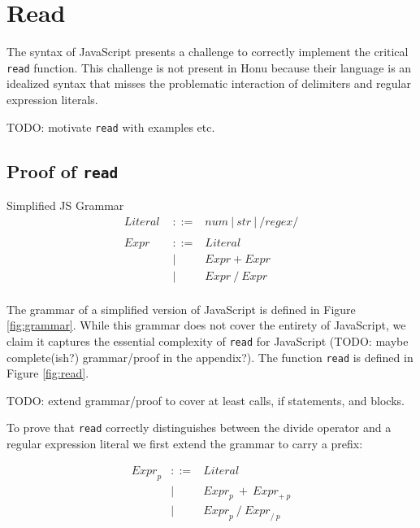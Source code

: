 \documentclass[preprint,10pt]{sigplanconf}
\begin{document}
\section{Read}
\label{sec-3}

The syntax of JavaScript presents a challenge to correctly implement
the critical \texttt{read} function. This challenge is not present in Honu
because their language is an idealized syntax that misses the
problematic interaction of delimiters and regular expression literals.

TODO: motivate \texttt{read} with examples etc.

\subsection{Proof of \texttt{read}}
\label{sec-3-1}

\begin{displayfigure}{\label{fig:grammar}Simplified JS Grammar}
\[
  \begin{array}{rrl}
    \textit{Literal }&::=& num ~|~ str ~|~ /regex/ \\
    \\
    \textit{Expr }&::=& \textit{Literal }\\
    &|& \textit{Expr}~ +~\textit{Expr }\\
    &|& \textit{Expr}~/~\textit{Expr }\\
  \end{array}
\]
\end{displayfigure}

The grammar of a simplified version of JavaScript is defined in Figure
\ref{fig:grammar}. While this grammar does not cover the entirety of
JavaScript, we claim it captures the essential complexity of \texttt{read}
for JavaScript (TODO: maybe complete(ish?) grammar/proof in the appendix?).
The function \texttt{read} is defined in Figure \ref{fig:read}.

TODO: extend grammar/proof to cover at least calls, if statements, and
blocks.

To prove that \texttt{read} correctly distinguishes between the divide
operator and a regular expression literal we first extend the grammar
to carry a prefix:

\[
\begin{array}{rrl}
  \textit{Expr}_{p} &::=& \textit{Literal}
  \\
  &|& \textit{Expr}_{p}~+~\textit{Expr}_{+~p}
  \\
  &|& \textit{Expr}_{p}~/~\textit{Expr}_{/~p}
\end{array}
\]
\end{document}
